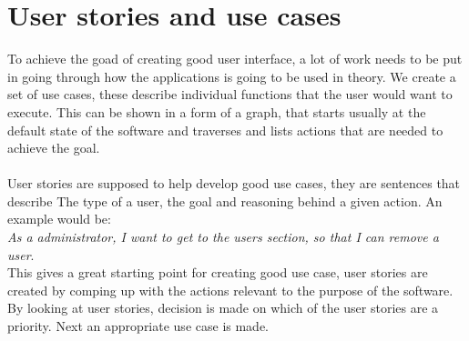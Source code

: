 \section{User stories and use cases}\label{userStoriesAndUseCases}
To achieve the goad of creating good user interface, a lot of work needs to be put in going through how the applications is going to be used in theory. We create a set of use cases, these describe individual functions that the user would want to execute. This can be shown in a form of a graph, that starts usually at the default state of the software and traverses and lists actions that are needed to achieve the goal.\\\\
User stories are supposed to help develop good use cases, they are sentences that describe The type of a user, the goal and reasoning behind a given action. An example would be:\\\emph{As a administrator, I want to get to the users section, so that I can remove a user}.\\
This gives a great starting point for creating good use case, user stories are created by comping up with the actions relevant to the purpose of the software. By looking at user stories, decision is made on which of the user stories are a priority. Next an appropriate use case is made.

